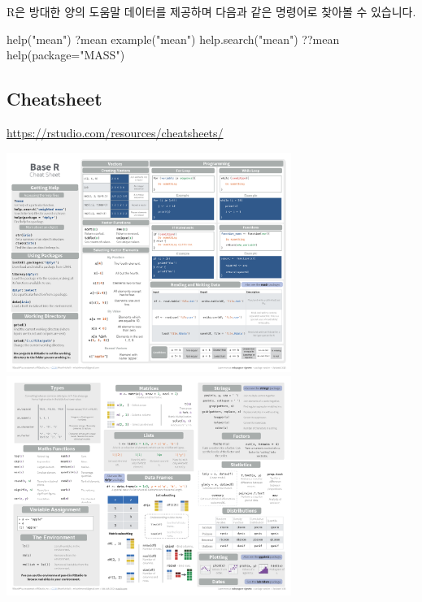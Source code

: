 \documentclass[
]{book}
\newenvironment{Shaded}{\begin{snugshade}}{\end{snugshade}}
\newcommand{\AttributeTok}[1]{\textcolor[rgb]{0.77,0.63,0.00}{#1}}
\newcommand{\FunctionTok}[1]{\textcolor[rgb]{0.00,0.00,0.00}{#1}}
\newcommand{\NormalTok}[1]{#1}
\newcommand{\StringTok}[1]{\textcolor[rgb]{0.31,0.60,0.02}{#1}}
\begin{document}
R은 방대한 양의 도움말 데이터를 제공하며 다음과 같은 명령어로 찾아볼 수 있습니다.

\begin{Shaded}
\begin{Highlighting}[]
\FunctionTok{help}\NormalTok{(}\StringTok{"mean"}\NormalTok{)}
\NormalTok{?mean}
\FunctionTok{example}\NormalTok{(}\StringTok{"mean"}\NormalTok{)}
\FunctionTok{help.search}\NormalTok{(}\StringTok{"mean"}\NormalTok{)}
\NormalTok{??mean}
\FunctionTok{help}\NormalTok{(}\AttributeTok{package=}\StringTok{"MASS"}\NormalTok{)}
\end{Highlighting}
\end{Shaded}

\hypertarget{cheatsheet}{%
\subsection{Cheatsheet}\label{cheatsheet}}

\url{https://rstudio.com/resources/cheatsheets/}

\includegraphics[width=3.64583in,height=\textheight]{images/01/base-r_1.png}
\includegraphics[width=3.64583in,height=\textheight]{images/01/base-r_2.png}
\end{document}
